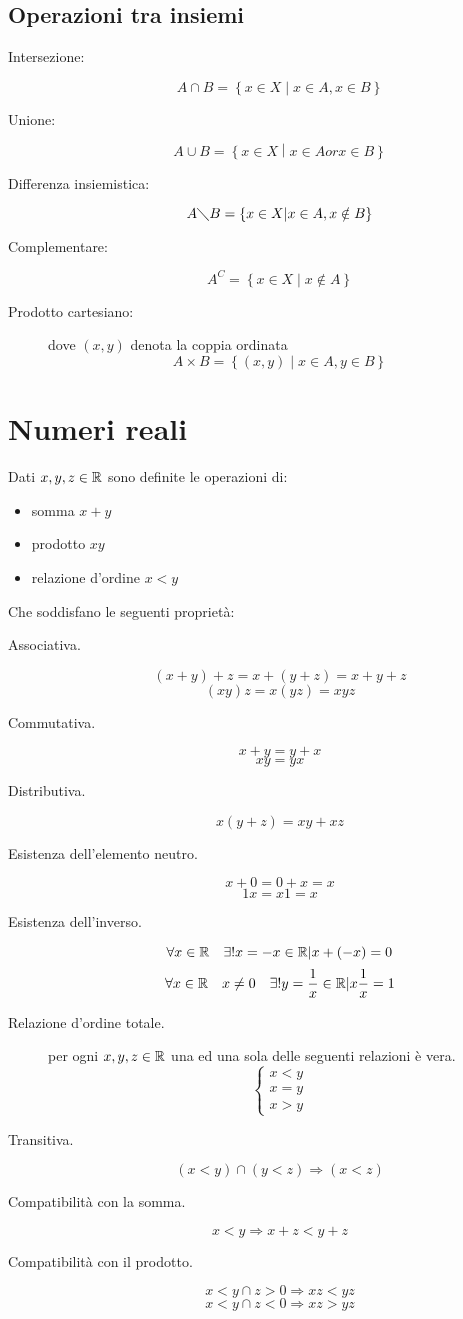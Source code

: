\subsection{Operazioni tra insiemi}
\begin{description}
  \item[Intersezione:]
    \[A \cap B = \left\{ x \in X \middle| x \in A, x \in B\right\}\]
  \item[Unione:]
    \[A \cup B = \left\{ x \in X \middle| x \in A or x \in B\right\}\]
  \item[Differenza insiemistica:]
    \[A \diagdown B = \left\{ x \in X \middle| x \in A, x \notin B\right\}\]
  \item[Complementare:]
    \[A^C = \left\{ x \in X \middle| x \notin A \right\}\]
  \item[Prodotto cartesiano:] dove $(x,y)$ denota la coppia ordinata
  \[A\times B = \left\{ (x,y) \middle| x\in A, y\in B\right\}\]
\end{description}

\section{Numeri reali}
Dati $x,y,z \in \mathbb{R}$ sono definite le operazioni di:
\begin{itemize}
\item somma $x+y$
\item prodotto $xy$
\item relazione d'ordine $x<y$
\end{itemize}
Che soddisfano le seguenti proprietà:

\begin{description}
  \item[Associativa.]
    \[(x+y)+z=x+(y+z)=x+y+z \]
    \[(xy)z=x(yz)=xyz \]
  \item[Commutativa.]
    \[x+y=y+x\]
    \[xy=yx\]
  \item[Distributiva.]
    \[x(y+z)=xy+xz\]
  \item[Esistenza dell'elemento neutro.]
    \[x+0=0+x=x\]
    \[1x=x1=x\]
  \item[Esistenza dell'inverso.]
      \[\forall x \in \mathbb{R} \quad \exists !x=-x \in \mathbb{R} | x+(-x)=0\]
      \[\forall x \in \mathbb{R} \quad x \neq 0 \quad \exists !y=\frac{1}{x} \in \mathbb{R} | x\frac{1}{x}=1 \]
  \item[Relazione d'ordine totale.] per ogni $x,y,z \in \mathbb{R}$ una ed una sola delle seguenti relazioni è vera.
    \[
    \begin{cases}
      x<y \\
      x=y \\
      x>y
    \end{cases}
    \]
  \item[Transitiva.]
    \[(x<y) \cap (y<z) \Rightarrow (x<z)\]
  \item[Compatibilità con la somma.]
    \[x<y \Rightarrow x+z<y+z\]
  \item[Compatibilità con il prodotto.]
    \[x<y \cap z>0 \Rightarrow xz<yz\]
    \[x<y \cap z<0 \Rightarrow xz>yz\]
\end{description}

